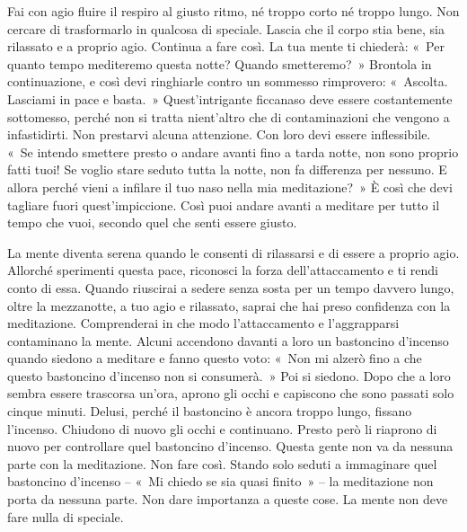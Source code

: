 Fai con agio fluire il respiro al giusto ritmo, né troppo corto né
troppo lungo. Non cercare di trasformarlo in qualcosa di speciale.
Lascia che il corpo stia bene, sia rilassato e a proprio agio. Continua
a fare così. La tua mente ti chiederà: «~Per quanto tempo mediteremo
questa notte? Quando smetteremo?~» Brontola in continuazione, e così
devi ringhiarle contro un sommesso rimprovero: «~Ascolta. Lasciami in
pace e basta.~» Quest'intrigante ficcanaso deve essere costantemente
sottomesso, perché non si tratta nient'altro che di contaminazioni che
vengono a infastidirti. Non prestarvi alcuna attenzione. Con loro devi
essere inflessibile. «~Se intendo smettere presto o andare avanti fino a
tarda notte, non sono proprio fatti tuoi! Se voglio stare seduto tutta
la notte, non fa differenza per nessuno. E allora perché vieni a
infilare il tuo naso nella mia meditazione?~» È così che devi tagliare
fuori quest'impiccione. Così puoi andare avanti a meditare per tutto il
tempo che vuoi, secondo quel che senti essere giusto.

La mente diventa serena quando le consenti di rilassarsi e di essere a
proprio agio. Allorché sperimenti questa pace, riconosci la forza
dell'attaccamento e ti rendi conto di essa. Quando riuscirai a sedere
senza sosta per un tempo davvero lungo, oltre la mezzanotte, a tuo agio
e rilassato, saprai che hai preso confidenza con la meditazione.
Comprenderai in che modo l'attaccamento e l'aggrapparsi contaminano la
mente. Alcuni accendono davanti a loro un bastoncino d'incenso quando
siedono a meditare e fanno questo voto: «~Non mi alzerò fino a che
questo bastoncino d'incenso non si consumerà.~» Poi si siedono. Dopo che
a loro sembra essere trascorsa un'ora, aprono gli occhi e capiscono che
sono passati solo cinque minuti. Delusi, perché il bastoncino è ancora
troppo lungo, fissano l'incenso. Chiudono di nuovo gli occhi e
continuano. Presto però li riaprono di nuovo per controllare quel
bastoncino d'incenso. Questa gente non va da nessuna parte con la
meditazione. Non fare così. Stando solo seduti a immaginare quel
bastoncino d'incenso -- «~Mi chiedo se sia quasi finito~» -- la
meditazione non porta da nessuna parte. Non dare importanza a queste
cose. La mente non deve fare nulla di speciale.

